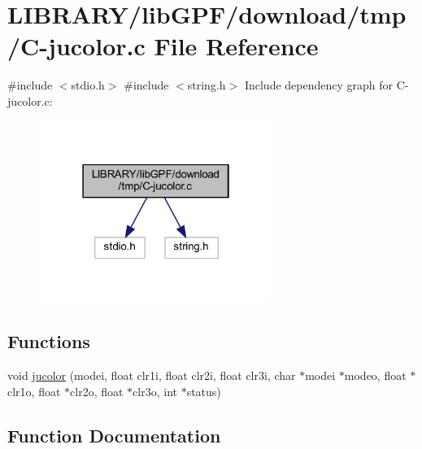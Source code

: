 \hypertarget{C-jucolor_8c}{}\section{L\+I\+B\+R\+A\+R\+Y/lib\+G\+P\+F/download/tmp/\+C-\/jucolor.c File Reference}
\label{C-jucolor_8c}
{\ttfamily \#include $<$stdio.\+h$>$}\newline
{\ttfamily \#include $<$string.\+h$>$}\newline
Include dependency graph for C-\/jucolor.c\+:
\nopagebreak
\begin{figure}[H]
\begin{center}
\leavevmode
\includegraphics[width=214pt]{C-jucolor_8c__incl}
\end{center}
\end{figure}
\subsection*{Functions}
\begin{DoxyCompactItemize}
\item 
void \hyperlink{C-jucolor_8c_ab1a7b686c79343455799a5c44294194b}{jucolor} (modei, float clr1i, float clr2i, float clr3i, char $\ast$modei $\ast$modeo, float $\ast$clr1o, float $\ast$clr2o, float $\ast$clr3o, int $\ast$status)
\end{DoxyCompactItemize}


\subsection{Function Documentation}
\mbox{\label{C-jucolor_8c_ab1a7b686c79343455799a5c44294194b}} 
